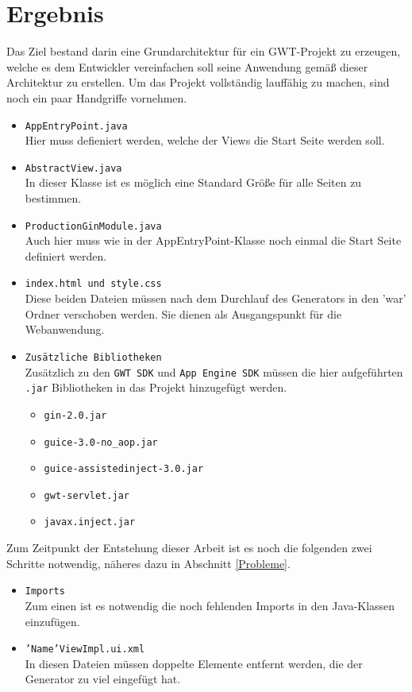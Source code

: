 \chapter{Ergebnis} \label{Ergebnis}

Das Ziel bestand darin eine Grundarchitektur für ein GWT-Projekt zu erzeugen,
welche es dem Entwickler vereinfachen soll seine Anwendung gemäß dieser
Architektur zu erstellen.
Um das Projekt vollständig lauffähig zu machen, sind noch ein paar Handgriffe
vornehmen.

\begin{itemize}
  \item \texttt{AppEntryPoint.java} \\
  Hier muss defieniert werden, welche der Views die Start Seite werden soll.
  \item \texttt{AbstractView.java} \\
  In dieser Klasse ist es möglich eine Standard Größe für alle Seiten zu
  bestimmen.
  \item \texttt{ProductionGinModule.java} \\
  Auch hier muss wie in der AppEntryPoint-Klasse noch einmal die Start Seite
  definiert werden.
  \item \texttt{index.html und style.css} \\
  Diese beiden Dateien müssen nach dem Durchlauf des Generators in den 'war'
  Ordner verschoben werden. Sie dienen als Ausgangspunkt für die Webanwendung.
  \item \texttt{Zusätzliche Bibliotheken}\\
  	Zusätzlich zu den \texttt{GWT SDK} und \texttt{App Engine SDK} müssen die
    hier aufgeführten \texttt{.jar} Bibliotheken in das Projekt hinzugefügt
    werden.
  	\begin{itemize}
  	  \item \texttt{gin-2.0.jar}
  	  \item \texttt{guice-3.0-no\_aop.jar}
  	  \item \texttt{guice-assistedinject-3.0.jar}
  	  \item \texttt{gwt-servlet.jar}
  	  \item \texttt{javax.inject.jar}
	\end{itemize}
\end{itemize}
Zum Zeitpunkt der Entstehung dieser Arbeit ist es noch die folgenden
zwei Schritte notwendig, näheres dazu in Abschnitt \ref{Probleme}.
\begin{itemize}
  \item \texttt{Imports} \\
  Zum einen ist es notwendig die noch fehlenden Imports in den Java-Klassen
  einzufügen. 
  \item \texttt{'Name'ViewImpl.ui.xml} \\
  In diesen Dateien müssen doppelte Elemente entfernt werden, die der Generator zu
  viel eingefügt hat.
\end{itemize} 

